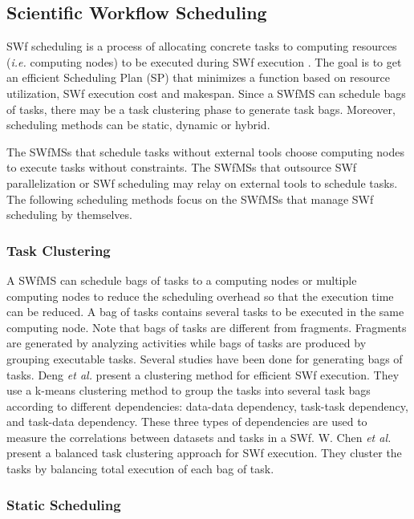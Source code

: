 \subsection{Scientific Workflow Scheduling}
\label{sec:sub:WS}

SWf scheduling is a process of allocating concrete tasks to computing
resources (\textit{i.e.} computing nodes) to be executed during SWf execution \cite{Bux2013}.
The goal is to get an efficient Scheduling Plan (SP) that minimizes a function based on resource utilization,
SWf execution cost and makespan. 
Since a SWfMS can schedule bags of tasks, there may be a task clustering phase to generate task bags.
Moreover, scheduling methods can be static, dynamic or hybrid. 

The SWfMSs that schedule tasks without external tools choose computing nodes 
to execute tasks without constraints. 
The SWfMSs that outsource SWf parallelization or SWf scheduling may relay on
external tools to schedule tasks. 
The following scheduling methods focus on the SWfMSs that manage SWf scheduling by themselves.

\subsubsection{Task Clustering}
A SWfMS can schedule bags of tasks to a computing nodes or multiple computing nodes to reduce the scheduling overhead
so that the execution time can be reduced. 
A bag of tasks contains several tasks to be executed in the same computing node. 
Note that bags of tasks are different from fragments. 
Fragments are generated by analyzing activities while bags of tasks are produced by grouping executable tasks.
Several studies have been done for generating bags of tasks.
Deng \textit{et al.} \cite{Deng2011} present a clustering method for efficient SWf execution. They use a k-means
clustering method to group the tasks into several task bags according
to different dependencies: data-data dependency, task-task dependency,
and task-data dependency. These three types of dependencies are used to measure the correlations
between datasets and tasks in a SWf. 
W. Chen \textit{et al.} \cite{Chen2013} present a balanced task
clustering approach for SWf execution. They cluster
the tasks by balancing total execution of each bag of task.

\subsubsection{Static Scheduling}

